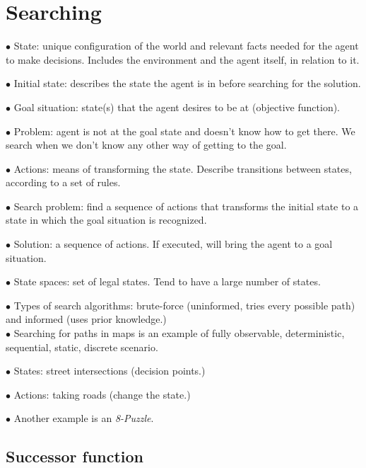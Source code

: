\documentclass[english,openany]{book}
\begin{document}
    \section{Searching}
    
    $\bullet$ State: unique configuration of the world and relevant facts needed for the agent to make decisions. Includes the environment and the agent itself, in relation to it.
    
    $\bullet$ Initial state: describes the state the agent is in before searching for the solution.
    
    $\bullet$ Goal situation: state(s) that the agent desires to be at (objective function).
    
    $\bullet$ Problem: agent is not at the goal state and doesn't know how to get there. We search when we don't know any other way of getting to the goal.
    
    $\bullet$ Actions: means of transforming the state. Describe transitions between states, according to a set of rules.
    
    $\bullet$ Search problem: find a sequence of actions that transforms the initial state to a state in which the goal situation is recognized.
    
    $\bullet$ Solution: a sequence of actions. If executed, will bring the agent to a goal situation.
    
    $\bullet$ State spaces: set of legal states. Tend to have a large number of states.
    
    $\bullet$ Types of search algorithms: brute-force (uninformed, tries every possible path) and informed (uses prior knowledge.)\\

    $\bullet$ Searching for paths in maps is an example of fully observable, deterministic, sequential, static, discrete scenario.
    
    $\bullet$ States: street intersections (decision points.)
    
    $\bullet$ Actions: taking roads (change the state.)
    
    $\bullet$ Another example is an \textit{8-Puzzle}.\\
    
    \subsection{Successor function}
    
    
\end{document}
